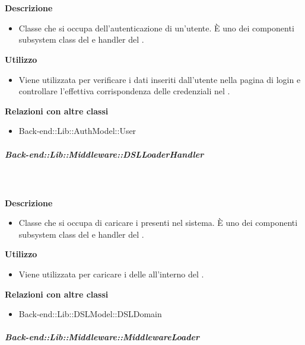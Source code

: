         \textbf{\\ \\ Descrizione} 
          \begin{itemize}
            \item[] Classe che si occupa dell'autenticazione di un'utente. È uno dei componenti subsystem class del   e handler del  .
          \end{itemize}      
        \textbf{Utilizzo}  
          \begin{itemize}
            \item[] Viene utilizzata per verificare i dati inseriti dall'utente nella pagina di login e controllare l'effettiva corrispondenza delle credenziali nel .
          \end{itemize}
          \textbf{Relazioni con altre classi}
          \begin{itemize}
              \item{Back-end::Lib::AuthModel::User}
          \end{itemize}
      \subparagraph{Back-end::Lib::Middleware::DSLLoaderHandler}
        
        \textbf{\\ \\ Descrizione} 
          \begin{itemize}
            \item[] Classe che si occupa di caricare i  presenti nel sistema. È uno dei componenti subsystem class del   e handler del  .
          \end{itemize}      
        \textbf{Utilizzo}  
          \begin{itemize}
            \item[] Viene utilizzata per caricare i  delle  all'interno del .
          \end{itemize}
          \textbf{Relazioni con altre classi}
          \begin{itemize}
              \item{Back-end::Lib::DSLModel::DSLDomain}
          \end{itemize}
      \subparagraph{Back-end::Lib::Middleware::MiddlewareLoader}
        
